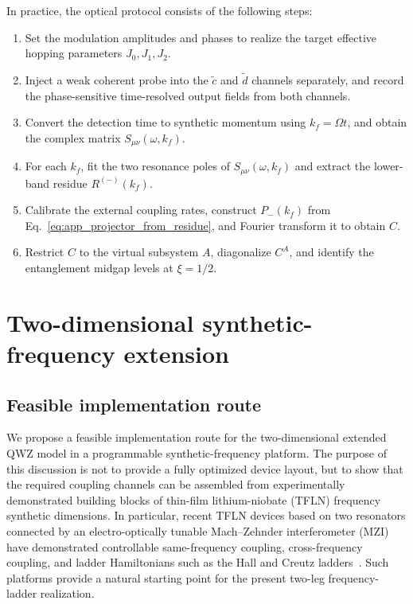 \documentclass[aps,prl,twocolumn,preprintnumbers,amsmath,amssymb,superscriptaddress,10pt]{revtex4-2}
\begin{document}
In practice, the optical protocol consists of the following steps:
\begin{enumerate}
\item Set the modulation amplitudes and phases to realize the target
effective hopping parameters $J_0,J_1,J_2$.
\item Inject a weak coherent probe into the $\tilde c$ and $\tilde d$
channels separately, and record the phase-sensitive time-resolved output
fields from both channels.
\item Convert the detection time to synthetic momentum using
$k_f=\Omega t$, and obtain the complex matrix
$S_{\mu\nu}(\omega,k_f)$.
\item For each $k_f$, fit the two resonance poles of
$S_{\mu\nu}(\omega,k_f)$ and extract the lower-band residue
$R^{(-)}(k_f)$.
\item Calibrate the external coupling rates, construct
$P_-(k_f)$ from Eq.~\eqref{eq:app_projector_from_residue}, and Fourier
transform it to obtain $C$.
\item Restrict $C$ to the virtual subsystem $A$, diagonalize $C^A$, and identify the entanglement midgap levels at $\xi=1/2$.
\end{enumerate}

\section{Two-dimensional synthetic-frequency extension}
\label{sec:SM_2D_extension}

\subsection{Feasible implementation route}
\label{sec:SM_2D_implementation}

We propose a feasible implementation route for the two-dimensional
extended QWZ model in a programmable synthetic-frequency platform. The
purpose of this discussion is not to provide a fully optimized device
layout, but to show that the required coupling channels can be
assembled from experimentally demonstrated building blocks of
thin-film lithium-niobate (TFLN) frequency synthetic dimensions. In
particular, recent TFLN devices based on two resonators connected by
an electro-optically tunable Mach--Zehnder interferometer (MZI) have
demonstrated controllable same-frequency coupling, cross-frequency
coupling, and ladder Hamiltonians such as the Hall and Creutz
ladders~\cite{wang2025versatile,ma2026reconfigurable}. Such platforms
provide a natural starting point for the present two-leg
frequency-ladder realization.
\end{document}
